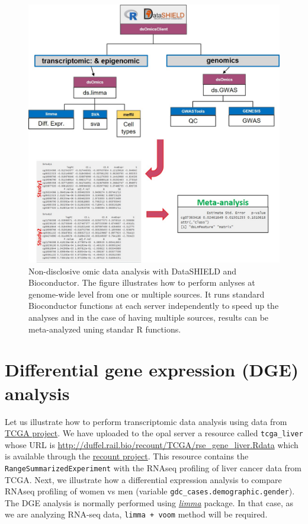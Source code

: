 \documentclass[
]{book}
\begin{document}
\begin{figure}

{\centering \includegraphics[width=14.62in]{fig/dsOmics_C} 

}

\caption{Non-disclosive omic data analysis with DataSHIELD and Bioconductor. The figure illustrates how to perform anlyses at genome-wide level from one or multiple sources. It runs standard Bioconductor functions at each server independently to speed up the analyses and in the case of having multiple sources, results can be meta-analyzed uning standar R functions.}\label{fig:omicAnal2}
\end{figure}

\hypertarget{differential-gene-expression-dge-analysis}{%
\chapter{Differential gene expression (DGE) analysis}\label{differential-gene-expression-dge-analysis}}

Let us illustrate how to perform transcriptomic data analysis using data from \href{https://www.cancer.gov/about-nci/organization/ccg/research/structural-genomics/tcga}{TCGA project}. We have uploaded to the opal server a resource called \texttt{tcga\_liver} whose URL is \url{http://duffel.rail.bio/recount/TCGA/rse_gene_liver.Rdata} which is available through the \href{https://jhubiostatistics.shinyapps.io/recount/}{recount project}. This resource contains the \texttt{RangeSummarizedExperiment} with the RNAseq profiling of liver cancer data from TCGA. Next, we illustrate how a differential expression analysis to compare RNAseq profiling of women vs men (variable \texttt{gdc\_cases.demographic.gender}). The DGE analysis is normally performed using \emph{\href{https://bioconductor.org/packages/3.12/limma}{limma}} package. In that case, as we are analyzing RNA-seq data, \texttt{limma\ +\ voom} method will be required.
\end{document}
